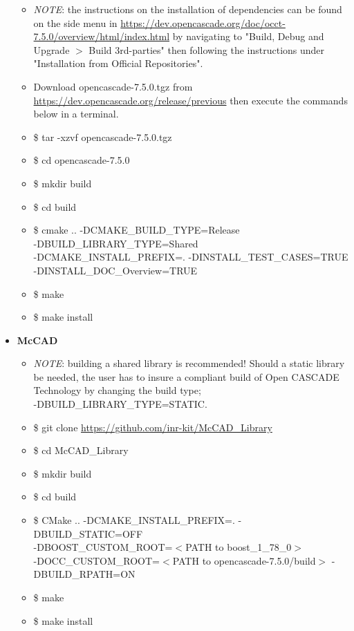 \documentclass[12pt, a4paper, titlepage]{article}
\begin{document}
\begin{itemize}
\begin{itemize}
        \item \emph{NOTE}: the instructions on the installation of dependencies can be found on the side menu in \url{https://dev.opencascade.org/doc/occt-7.5.0/overview/html/index.html} by navigating to "Build, Debug and Upgrade $>$ Build 3rd-parties" then following the instructions under "Installation from Official Repositories".
    	\item Download opencascade-7.5.0.tgz from \url{https://dev.opencascade.org/release/previous} then execute the commands below in a terminal.
    	\item \$ tar -xzvf opencascade-7.5.0.tgz
    	\item \$ cd opencascade-7.5.0
    	\item \$ mkdir build
    	\item \$ cd build
    	\item \$ cmake .. -DCMAKE\_BUILD\_TYPE=Release \\-DBUILD\_LIBRARY\_TYPE=Shared \\ -DCMAKE\_INSTALL\_PREFIX=. -DINSTALL\_TEST\_CASES=TRUE \\ -DINSTALL\_DOC\_Overview=TRUE
    	\item \$ make
    	\item \$ make install
      \end{itemize}
	  \item \textbf{McCAD}
	  \begin{itemize}
		\item \emph{NOTE}: building a shared library is recommended! Should a static library be needed, the user has to insure a compliant build of Open CASCADE Technology by changing the build type; \\ -DBUILD\_LIBRARY\_TYPE=STATIC.
		\item \$ git clone \url{https://github.com/inr-kit/McCAD_Library}
		\item \$ cd McCAD\_Library
		\item \$ mkdir build
		\item \$ cd build
		\item \$ CMake .. -DCMAKE\_INSTALL\_PREFIX=. -DBUILD\_STATIC=OFF \\ -DBOOST\_CUSTOM\_ROOT=$<$PATH to boost\_1\_78\_0$>$ \\-DOCC\_CUSTOM\_ROOT=$<$PATH to opencascade-7.5.0/build$>$ -DBUILD\_RPATH=ON
		\item \$ make
		\item \$ make install
	  \end{itemize}
    \end{itemize}
\end{document}

